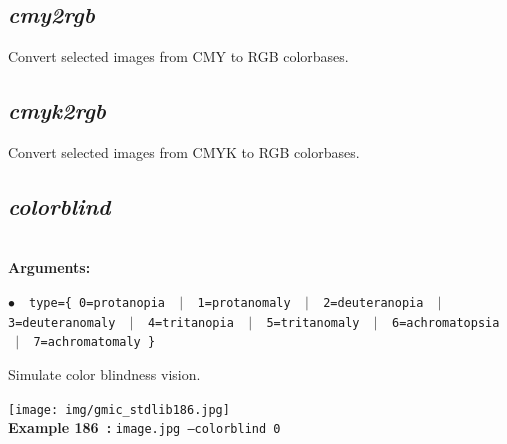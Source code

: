 \documentclass[a4paper,10.5pt,twoside]{book}
\newcommand{\Cb}[1]{\textcolor{cb}{#1}}
\begin{document}
\subsection{\emph{cmy2rgb} }\vspace*{-0.7em}
Convert selected images from CMY to RGB colorbases.


\subsection{\emph{cmyk2rgb} }\vspace*{-0.7em}
Convert selected images from CMYK to RGB colorbases.


\subsection{\emph{colorblind} }\vspace*{-0.7em}
~\\\textbf{\Cb{Arguments: }}\begin{flushleft}
{\small \Cb{\hspace*{0.5cm}$\bullet$~~\texttt{type=\{ 0=protanopia ~$|$~ 1=protanomaly ~$|$~ 2=deuteranopia ~$|$~ 3=deu\-teranomaly ~$|$~ 4=tritanopia ~$|$~ 5=tritanomaly ~$|$~ 6=achromatopsia \-~$|$~ 7=achromatomaly \}}}}\end{flushleft}
Simulate color blindness vision.
\begin{center}\texttt{[image: img/gmic\_stdlib186.jpg]}\\
{\footnotesize \textbf{Example 186~:} \texttt{image.jpg --colorblind 0}}
\end{center}
\end{document}
